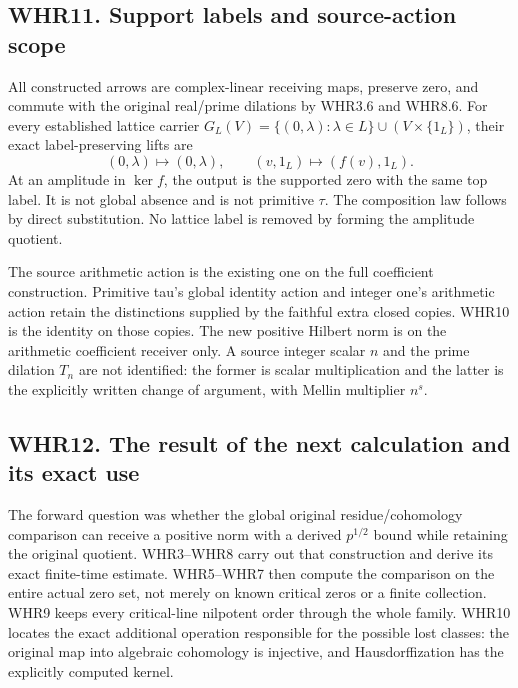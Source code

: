 \subsection{WHR11. Support labels and source-action
scope}\label{whr11.-support-labels-and-source-action-scope}

All constructed arrows are complex-linear receiving maps, preserve zero,
and commute with the original real/prime dilations by WHR3.6 and WHR8.6.
For every established lattice carrier
\(G_L(V)=\{(0,\lambda):\lambda\in L\}\cup(V\times\{1_L\})\), their exact
label-preserving lifts are \[
 (0,\lambda)\longmapsto(0,\lambda),\qquad
 (v,1_L)\longmapsto(f(v),1_L).
 \tag{WHR11.1}
\] At an amplitude in \(\ker f\), the output is the supported zero with
the same top label. It is not global absence and is not primitive
\(\tau\). The composition law follows by direct substitution. No lattice
label is removed by forming the amplitude quotient.

The source arithmetic action is the existing one on the full coefficient
construction. Primitive tau's global identity action and integer one's
arithmetic action retain the distinctions supplied by the faithful extra
closed copies. WHR10 is the identity on those copies. The new positive
Hilbert norm is on the arithmetic coefficient receiver only. A source
integer scalar \(n\) and the prime dilation \(T_n\) are not identified:
the former is scalar multiplication and the latter is the explicitly
written change of argument, with Mellin multiplier \(n^s\).

\subsection{WHR12. The result of the next calculation and its exact
use}\label{whr12.-the-result-of-the-next-calculation-and-its-exact-use}

The forward question was whether the global original residue/cohomology
comparison can receive a positive norm with a derived \(p^{1/2}\) bound
while retaining the original quotient. WHR3--WHR8 carry out that
construction and derive its exact finite-time estimate. WHR5--WHR7 then
compute the comparison on the entire actual zero set, not merely on
known critical zeros or a finite collection. WHR9 keeps every
critical-line nilpotent order through the whole family. WHR10 locates
the exact additional operation responsible for the possible lost
classes: the original map into algebraic cohomology is injective, and
Hausdorffization has the explicitly computed kernel.

